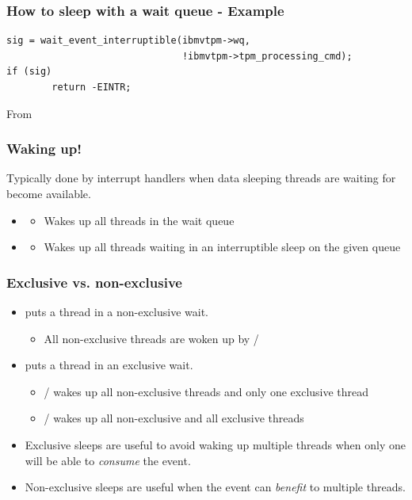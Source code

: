 \begin{frame}[fragile]
\frametitle{How to sleep with a wait queue - Example}
\begin{verbatim}
sig = wait_event_interruptible(ibmvtpm->wq,
                               !ibmvtpm->tpm_processing_cmd);
if (sig)
        return -EINTR;
\end{verbatim}
From 
\end{frame}

\begin{frame}
  \frametitle{Waking up!}
  Typically done by interrupt handlers when data sleeping
  threads are waiting for become available.
  \begin{itemize}
  \item {}
    \begin{itemize}
    \item Wakes up all threads in the wait queue
    \end{itemize}
  \item {}
    \begin{itemize}
    \item Wakes up all threads waiting in an interruptible sleep
      on the given queue
    \end{itemize}
  \end{itemize}
\end{frame}


\begin{frame}
  \frametitle{Exclusive vs. non-exclusive}
  \begin{itemize}
  \item {} puts a thread in a
    non-exclusive wait.
    \begin{itemize}
    \item All non-exclusive threads are woken up by  /
    \end{itemize}
  \item {} puts a thread in an
    exclusive wait.
    \begin{itemize}
    \item {} /  wakes up
      all non-exclusive threads and only one exclusive thread
    \item {} / 
      wakes up all non-exclusive and all exclusive threads
    \end{itemize}
  \item Exclusive sleeps are useful to avoid waking up multiple threads
    when only one will be able to \textit{consume} the event.
  \item Non-exclusive sleeps are useful when the event can
    \textit{benefit} to multiple threads.
  \end{itemize}
\end{frame}

